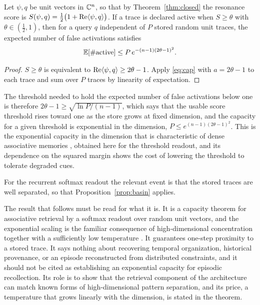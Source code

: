 \begin{proposition}\label{prop:falseact}
Let $\psi,q$ be unit vectors in $\mathbb{C}^n$, so that by Theorem~\ref{thm:closed} the resonance score is $S(\psi,q)=\tfrac12\bigl(1+\operatorname{Re}\langle \psi,q\rangle\bigr)$. If a trace is declared active when $S\ge\theta$ with $\theta\in(\tfrac12,1)$, then for a query $q$ independent of $P$ stored random unit traces, the expected number of false activations satisfies
\begin{equation}
\mathbb{E}[\#\text{active}]\le P\,e^{-(n-1)(2\theta-1)^2}.
\end{equation}
\end{proposition}

\begin{proof}
$S\ge\theta$ is equivalent to $\operatorname{Re}\langle \psi,q\rangle\ge2\theta-1$. Apply \eqref{eq:cap} with $a=2\theta-1$ to each trace and sum over $P$ traces by linearity of expectation.
\end{proof}

The threshold needed to hold the expected number of false activations below one is therefore $2\theta-1\ge\sqrt{\ln P/(n-1)}$, which says that the usable score threshold rises toward one as the store grows at fixed dimension, and the capacity for a given threshold is exponential in the dimension, $P\le e^{(n-1)(2\theta-1)^2}$. This is the exponential capacity in the dimension that is characteristic of dense associative memories \cite{demircigil2017,ramsauer2021}, obtained here for the threshold readout, and its dependence on the squared margin shows the cost of lowering the threshold to tolerate degraded cues.

For the recurrent softmax readout the relevant event is that the stored traces are well separated, so that Proposition~\ref{prop:basin} applies.

The result that follows must be read for what it is. It is a capacity theorem for associative retrieval by a softmax readout over random unit vectors, and the exponential scaling is the familiar consequence of high-dimensional concentration together with a sufficiently low temperature \cite{demircigil2017,ramsauer2021}. It guarantees one-step proximity to a stored trace. It says nothing about recovering temporal organization, historical provenance, or an episode reconstructed from distributed constraints, and it should not be cited as establishing an exponential capacity for episodic recollection. Its role is to show that the retrieval component of the architecture can match known forms of high-dimensional pattern separation, and its price, a temperature that grows linearly with the dimension, is stated in the theorem.

